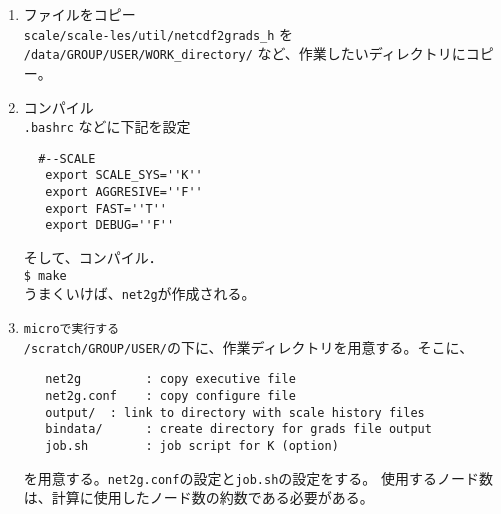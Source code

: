 \begin{enumerate}
\item ファイルをコピー\\
 \verb|scale/scale-les/util/netcdf2grads_h| を \verb|/data/GROUP/USER/WORK_directory/| など、作業したいディレクトリにコピー。
\item コンパイル\\
 \verb|.bashrc| などに下記を設定
 \begin{verbatim}
  #--SCALE
   export SCALE_SYS=''K''
   export AGGRESIVE=''F''
   export FAST=''T''
   export DEBUG=''F''
 \end{verbatim}
 そして、コンパイル．\\
 \verb|$ make|\\
 うまくいけば、\verb|net2g|が作成される。
\item \verb|microで実行する| \\
 \verb|/scratch/GROUP/USER/|の下に、作業ディレクトリを用意する。そこに、
 \begin{verbatim}
   net2g         : copy executive file
   net2g.conf    : copy configure file
   output/  : link to directory with scale history files
   bindata/      : create directory for grads file output
   job.sh        : job script for K (option)
 \end{verbatim}
 を用意する。\verb|net2g.conf|の設定と\verb|job.sh|の設定をする。
 使用するノード数は、計算に使用したノード数の約数である必要がある。
\end{enumerate}



